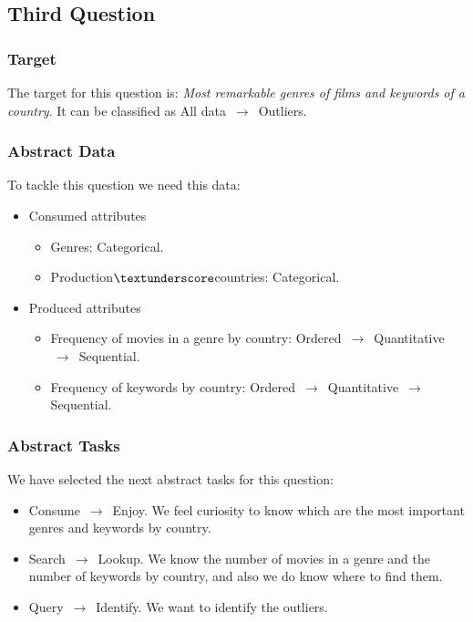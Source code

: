 \subsection{Third Question}

\subsubsection{Target}
The target for this question is: \textit{Most remarkable genres of films and keywords of a country}. It can be classified as All data $\,\to\,$ Outliers.

\subsubsection{Abstract Data}

To tackle this question we need this data:

\begin{itemize}
	\item Consumed attributes
		\begin{itemize}
			\item Genres: Categorical.
			\item Production$\textunderscore$countries: Categorical.
		\end{itemize}
	\item Produced attributes
		\begin{itemize}
			\item Frequency of movies in a genre by country: Ordered $\,\to\,$ Quantitative $\,\to\,$ Sequential.
			\item Frequency of keywords by country: Ordered $\,\to\,$ Quantitative $\,\to\,$ Sequential.
		\end{itemize}
\end{itemize}

\subsubsection{Abstract Tasks}

We have selected the next abstract tasks for this question:

\begin{itemize}
	\item Consume $\,\to\,$ Enjoy. We feel curiosity to know which are the most important genres and keywords by country.
	\item Search $\,\to\,$ Lookup. We know the number of movies in a genre and the number of keywords by country, and also we do know where to find them.
	\item Query $\,\to\,$ Identify. We want to identify the outliers.
\end{itemize}

